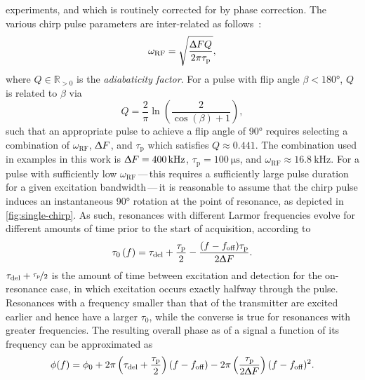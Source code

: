 experiments, and which is routinely corrected for by phase correction.
The various chirp pulse parameters are inter-related as
follows~\cite{Foroozandeh2019,Kupce1995b}:
\begin{equation}
    \omega_{\text{RF}} = \sqrt{
        \frac{\Updelta F Q}{2 \pi \tau_{\text{p}}}
    },
\end{equation}
where $Q \in \mathbb{R}_{>0}$ is the \emph{adiabaticity factor}.
For a pulse with flip angle  $\beta < \ang{180}$, $Q$ is related to $\beta$ via
\begin{equation}
    Q = \frac{2}{\pi} \ln \left( \frac{2}{\cos(\beta) + 1} \right),
\end{equation}
such that an appropriate pulse to achieve a flip angle of \ang{90} requires
selecting a combination of $\omega_{\text{RF}}$, $\Updelta F$, and
$\tau_{\text{p}}$ which satisfies $Q \approx 0.441$.
The combination used in examples in this work is $\Updelta F =
\qty{400}{\kilo\hertz}$, $\tau_{\text{p}} = \qty{100}{\micro\second}$, and
$\omega_{\text{RF}} \approx \qty{16.8}{\kilo\hertz}$.
For a pulse with sufficiently low $\omega_{\text{RF}}$\,---\,this requires a
sufficiently large pulse duration for a given excitation bandwidth\,---\,it is
reasonable to assume that the chirp pulse induces an instantaneous \ang{90}
rotation at the point of resonance, as depicted in
\cref{fig:single-chirp}. As such, resonances with different
Larmor frequencies evolve for different amounts of time prior to the start of
acquisition, according to
\begin{equation}
    \tau_0\left(f\right) =
        \tau_{\text{del}} + \frac{\tau_{\text{p}}}{2} -
        \frac{(f - f_{\text{off}}) \tau_{\text{p}}}{2 \Updelta F}.
    \label{eq:t0}
\end{equation}
$\tau_{\text{del}} + \nicefrac{\tau_{\text{p}}}{2}$ is the amount of time
between excitation and detection for the on-resonance case, in which
excitation occurs exactly halfway through the pulse. Resonances
with a frequency smaller than that of the transmitter are excited earlier and hence
have a larger $\tau_0$, while the converse is true for resonances with greater
frequencies. The resulting overall phase as of a signal a function of its
frequency can be approximated as~\cite{Foroozandeh2019}
\begin{equation}
    \phi(f) = \phi_0 + 2 \pi \left(\tau_{\text{del}} + \frac{\tau_{\text{p}}}{2} \right) (f - f_{\text{off}}) -
        2 \pi \left(\frac{\tau_{\text{p}}}{2 \Updelta F}\right)
        (f - f_{\text{off}})^2.
    \label{eq:quadratic-phase}
\end{equation}
